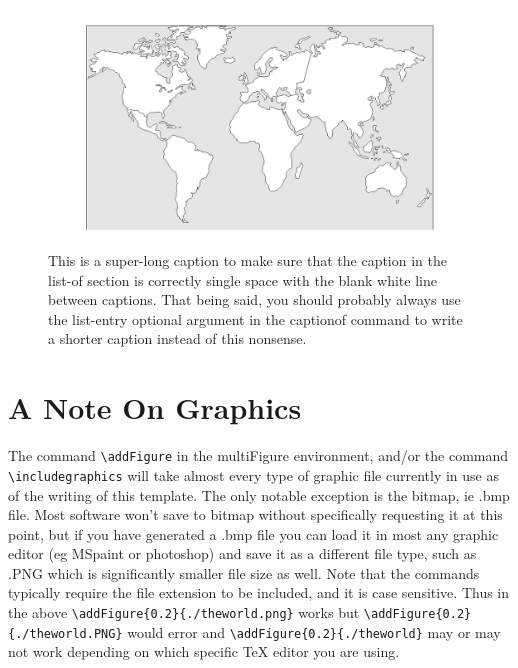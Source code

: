 \begin{figure}
    \centering
    \includegraphics[scale=.2]{theworld.png}
    \caption[Figure Caption]{This is a super-long caption to make sure that the caption in the list-of section is correctly single space with the blank white line between captions. That being said, you should probably always use the list-entry optional argument in the captionof command to write a shorter caption instead of this nonsense.}
    \label{fig:my_label}
\end{figure}

\section{A Note On Graphics}
The command \verb|\addFigure| in the multiFigure environment, and/or the command \verb|\includegraphics| will take almost every type of graphic file currently in use as of the writing of this template. The only notable exception is the bitmap, ie .bmp file. Most software won't save to bitmap without specifically requesting it at this point, but if you have generated a .bmp file you can load it in most any graphic editor (eg MSpaint or photoshop) and save it as a different file type, such as .PNG which is significantly smaller file size as well. Note that the commands typically require the file extension to be included, and it is case sensitive. Thus in the above \verb|\addFigure{0.2}{./theworld.png}| works but \verb|\addFigure{0.2}{./theworld.PNG}| would error and \verb|\addFigure{0.2}{./theworld}| may or may not work depending on which specific TeX editor you are using.

